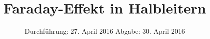 

\subject{Fortgeschrittenen Praktikum - V46}
\title{Faraday-Effekt in Halbleitern}
\date{
  Durchführung: 27. April 2016
  \hspace{3em}
  Abgabe: 30. April 2016
}



\maketitle
\thispagestyle{empty}
\tableofcontents
\newpage






\printbibliography


